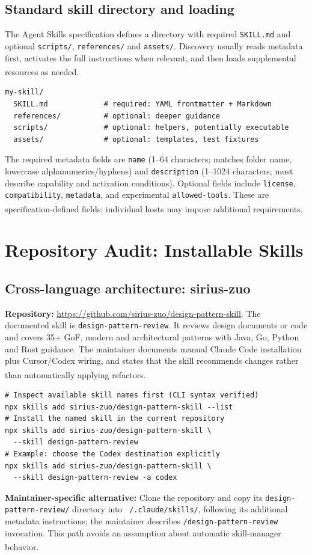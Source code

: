 \documentclass[11pt,letterpaper]{article}
\newcommand{\src}[1]{\textsuperscript{\textcolor{teal}{\cite{#1}}}}
\begin{document}
\subsection{Standard skill directory and loading}
The Agent Skills specification defines a directory with required \texttt{SKILL.md} and optional \texttt{scripts/}, \texttt{references/} and \texttt{assets/}. Discovery usually reads metadata first, activates the full instructions when relevant, and then loads supplemental resources as needed.\src{spec,spechome}
\begin{verbatim}
my-skill/
  SKILL.md             # required: YAML frontmatter + Markdown
  references/          # optional: deeper guidance
  scripts/             # optional: helpers, potentially executable
  assets/              # optional: templates, test fixtures
\end{verbatim}
The required metadata fields are \texttt{name} (1--64 characters; matches folder name, lowercase alphanumerics/hyphens) and \texttt{description} (1--1024 characters; must describe capability and activation conditions). Optional fields include \texttt{license}, \texttt{compatibility}, \texttt{metadata}, and experimental \texttt{allowed-tools}. These are specification-defined fields; individual hosts may impose additional requirements.\src{spec}

\section{Repository Audit: Installable Skills}
\subsection{Cross-language architecture: sirius-zuo}
\textbf{Repository:} \url{https://github.com/sirius-zuo/design-pattern-skill}. The documented skill is \texttt{design-pattern-review}. It reviews design documents or code and covers 35+ GoF, modern and architectural patterns with Java, Go, Python and Rust guidance. The maintainer documents manual Claude Code installation plus Cursor/Codex wiring, and states that the skill recommends changes rather than automatically applying refactors.\src{sirius}
\begin{verbatim}
# Inspect available skill names first (CLI syntax verified)
npx skills add sirius-zuo/design-pattern-skill --list
# Install the named skill in the current repository
npx skills add sirius-zuo/design-pattern-skill \
  --skill design-pattern-review
# Example: choose the Codex destination explicitly
npx skills add sirius-zuo/design-pattern-skill \
  --skill design-pattern-review -a codex
\end{verbatim}
\textbf{Maintainer-specific alternative:} Clone the repository and copy its \texttt{design-pattern-review/} directory into \texttt{\string~/.claude/skills/}, following its additional metadata instructions; the maintainer describes \texttt{/design-pattern-review} invocation. This path avoids an assumption about automatic skill-manager behavior.\src{sirius}
\end{document}
